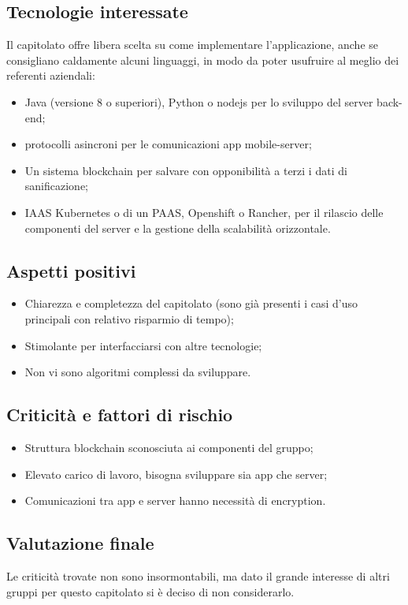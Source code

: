 \subsection{Tecnologie interessate}
Il capitolato offre libera scelta su come implementare l'applicazione, anche se consigliano caldamente alcuni linguaggi, in modo da poter usufruire al meglio dei referenti aziendali:
\begin{itemize}
\item Java (versione 8 o superiori), Python o nodejs per lo sviluppo del server back-end;
\item protocolli asincroni per le comunicazioni app mobile-server;
\item Un sistema blockchain per salvare con opponibilità a terzi i dati di sanificazione;
\item IAAS Kubernetes o di un PAAS, Openshift o Rancher, per il rilascio delle componenti del server e la
gestione della scalabilità orizzontale.
\end{itemize}

\subsection{Aspetti positivi}
\begin{itemize}
\item Chiarezza e completezza del capitolato (sono già presenti i casi d'uso principali con relativo risparmio di tempo);
\item Stimolante per interfacciarsi con altre tecnologie; 
\item Non vi sono algoritmi complessi da sviluppare.
\end{itemize}

\subsection{Criticità e fattori di rischio}
\begin{itemize}
\item Struttura blockchain sconosciuta ai componenti del gruppo;
\item Elevato carico di lavoro, bisogna sviluppare sia app che server;
\item Comunicazioni tra app e server hanno necessità di encryption.
\end{itemize}

\subsection{Valutazione finale}
Le criticità trovate non sono insormontabili, ma dato il grande interesse di altri gruppi per questo capitolato si è deciso di non considerarlo.

